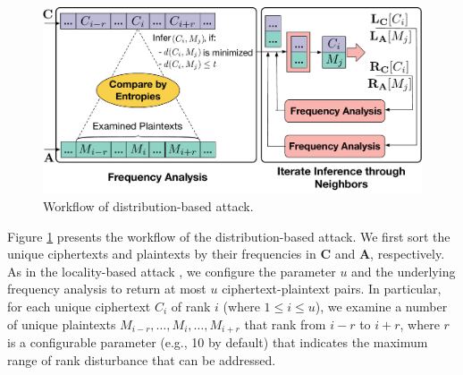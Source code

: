 
\begin{figure}[t]
\centering
\includegraphics[width=.48\textwidth]{pic/distribution-attack.pdf}
\caption{Workflow of  distribution-based attack.}
\label{fig:distribution-attack}
\end{figure}

Figure \ref{fig:distribution-attack} presents the workflow of the
distribution-based attack. We first sort the unique ciphertexts and  plaintexts by
their frequencies in $\mathbf{C}$ and $\mathbf{A}$, respectively. As in the
locality-based attack \cite{li17}, we configure the parameter $u$ and 
the underlying frequency analysis to return at most $u$ ciphertext-plaintext
pairs.  In particular, for each unique ciphertext $C_i$ of rank $i$ (where 
$1 \leq i \leq u$), we examine a number of unique plaintexts $M_{i-r}, \ldots,
M_i, \ldots, M_{i+r}$ that rank from $i-r$ to $i+r$, where $r$ is a
configurable parameter (e.g., 10 by default) that indicates the maximum range
of rank disturbance that can be addressed. 


